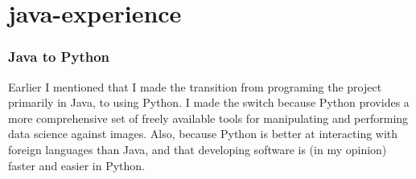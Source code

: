 \chapter{java-experience}

\subsection{Java to Python}

Earlier I mentioned that I made the transition from programing the project primarily in Java, to using Python.  I made the switch because Python provides a more comprehensive set of freely available tools for manipulating and performing data science against images.  Also, because Python is better at interacting with foreign languages than Java, and that developing software is (in my opinion) faster and easier in Python.

